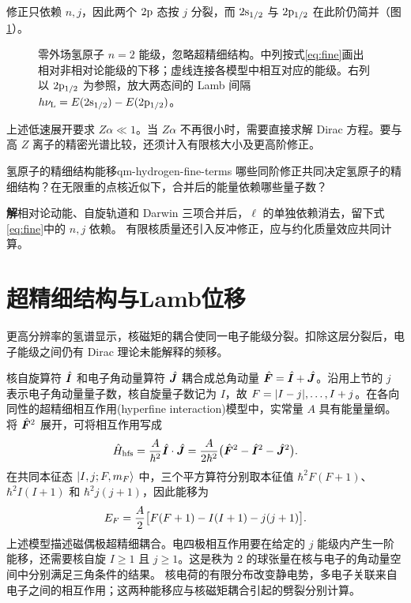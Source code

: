 修正只依赖 $n,j$，因此两个 $2\mathrm{p}$ 态按 $j$ 分裂，而 $2\mathrm{s}_{1/2}$ 与 $2\mathrm{p}_{1/2}$ 在此阶仍简并（图\ref{fig:hydrogen-fine-lamb}）。

\begin{figure}[htbp]
    \centering{}
    \caption{零外场氢原子 $n = 2$ 能级，忽略超精细结构。中列按式\eqref{eq:fine}画出相对非相对论能级的下移；虚线连接各模型中相互对应的能级。右列以 $2\mathrm{p}_{1/2}$ 为参照，放大两态间的 Lamb 间隔 $h\nu_{\mathrm{L}} = E(2\mathrm{s}_{1/2}) - E(2\mathrm{p}_{1/2})$。}
    \label{fig:hydrogen-fine-lamb}
\end{figure}

上述低速展开要求 $Z\alpha \ll 1$。当 $Z\alpha$ 不再很小时，需要直接求解 Dirac 方程。要与高 $Z$ 离子的精密光谱比较，还须计入有限核大小及更高阶修正。

\begin{example}{氢原子的精细结构能移}{qm-hydrogen-fine-terms}
    哪些同阶修正共同决定氢原子的精细结构？在无限重的点核近似下，合并后的能量依赖哪些量子数？

    \par\smallskip\textbf{解}\quad 相对论动能、自旋轨道和 Darwin 三项合并后，$\ell$ 的单独依赖消去，留下式\eqref{eq:fine}中的 $n,j$ 依赖。
    有限核质量还引入反冲修正，应与约化质量效应共同计算。
\end{example}

\section{超精细结构与Lamb位移}
更高分辨率的氢谱显示，核磁矩的耦合使同一电子能级分裂。扣除这层分裂后，电子能级之间仍有 Dirac 理论未能解释的频移。

核自旋算符 $\hat{\bm{I}}$ 和电子角动量算符 $\hat{\bm{J}}$ 耦合成总角动量 $\hat{\bm{F}} = \hat{\bm{I}} + \hat{\bm{J}}$。沿用上节的 $j$ 表示电子角动量量子数，核自旋量子数记为 $I$，故 $F = \lvert I - j\rvert,\ldots,I + j$。在各向同性的超精细相互作用(hyperfine interaction)模型中，实常量 $A$ 具有能量量纲。将 $\hat{\bm{F}}^2$ 展开，可将相互作用写成
\begin{equation}
    \hat{H}_{\mathrm{hfs}} = \frac{A}{\hbar^2}\hat{\bm{I}} \cdot \hat{\bm{J}}
    = \frac{A}{2\hbar^2}\bigl(\hat{\bm{F}}^2 - \hat{\bm{I}}^2 - \hat{\bm{J}}^2\bigr).
\end{equation}
在共同本征态 $\lvert I,j;F,m_F\rangle$ 中，三个平方算符分别取本征值 $\hbar^2 F(F + 1)$、$\hbar^2 I(I + 1)$ 和 $\hbar^2 j(j + 1)$，因此能移为
\begin{equation}
    E_F = \frac{A}{2}\bigl[F(F + 1) - I(I + 1) - j(j + 1)\bigr].
\end{equation}
上述模型描述磁偶极超精细耦合。电四极相互作用要在给定的 $j$ 能级内产生一阶能移，还需要核自旋 $I \geq 1$ 且 $j \geq 1$。这是秩为 $2$ 的球张量在核与电子的角动量空间中分别满足三角条件的结果。
核电荷的有限分布改变静电势，多电子关联来自电子之间的相互作用；这两种能移应与核磁矩耦合引起的劈裂分别计算。

